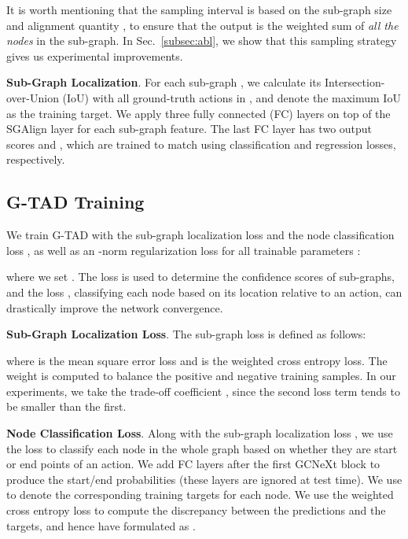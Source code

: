 \documentclass[10pt,twocolumn,letterpaper]{article}
\begin{document}
It is worth mentioning that the sampling interval  is based on the sub-graph size  and alignment quantity , to ensure that the output  is the weighted sum of \emph{all the nodes} in the sub-graph. In Sec.~\ref{subsec:abl}, we show that this sampling strategy gives us experimental improvements.


\noindent \textbf{Sub-Graph Localization}. For each sub-graph , we calculate its Intersection-over-Union (IoU) with all ground-truth actions  in , and denote the maximum IoU  as the training target.
We apply three fully connected (FC) layers on top of the SGAlign layer for each sub-graph feature.
The last FC layer has two output scores   and  , which are trained to match  using classification and regression losses,  respectively.


\subsection{G-TAD Training}

We train G-TAD with the sub-graph localization loss  and the node classification loss , as well as an -norm regularization loss   for all trainable parameters :


where we set . The loss  is used to determine the confidence scores of sub-graphs, 
and the loss , classifying each node based on its location relative to an action, can drastically improve the network convergence. 


\noindent \textbf{Sub-Graph Localization Loss}. The sub-graph loss  is defined as follows:

where  is the mean square error loss and  is the weighted cross entropy loss. The weight is computed to balance the positive and negative training samples.  In our experiments, we take the trade-off coefficient , since the second loss term tends to be smaller than the first. 

\noindent \textbf{Node Classification Loss}. Along with the sub-graph localization loss , we use the loss  to classify each node in the whole graph based on whether they are start or end points of an action. We add FC layers after the first GCNeXt block to produce the start/end probabilities  (these layers are ignored at test time). 
We use  to denote the corresponding training targets for each node.
We use the weighted cross entropy loss to compute the discrepancy between the predictions and the targets, and hence have  formulated as . 
\end{document}

